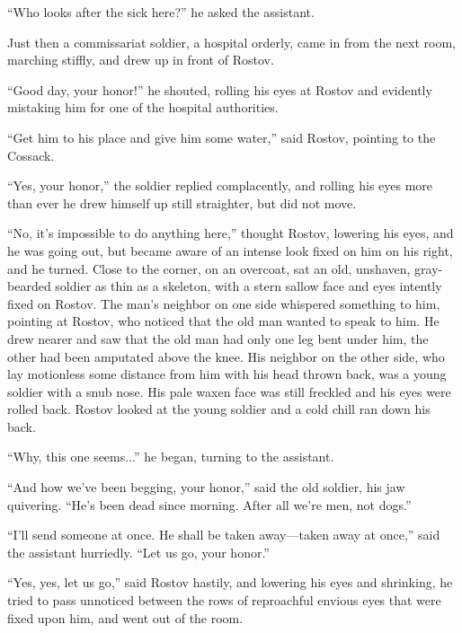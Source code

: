 ``Who looks after the sick here?'' he asked the assistant.

Just then a commissariat soldier, a hospital orderly, came in
from the next room, marching stiffly, and drew up in front of
Rostov.

``Good day, your honor!'' he shouted, rolling his eyes at Rostov
and evidently mistaking him for one of the hospital authorities.

``Get him to his place and give him some water,'' said Rostov,
pointing to the Cossack.

``Yes, your honor,'' the soldier replied complacently, and
rolling his eyes more than ever he drew himself up still
straighter, but did not move.

``No, it's impossible to do anything here,'' thought Rostov,
lowering his eyes, and he was going out, but became aware of an
intense look fixed on him on his right, and he turned. Close to
the corner, on an overcoat, sat an old, unshaven, gray-bearded
soldier as thin as a skeleton, with a stern sallow face and eyes
intently fixed on Rostov. The man's neighbor on one side
whispered something to him, pointing at Rostov, who noticed that
the old man wanted to speak to him. He drew nearer and saw that
the old man had only one leg bent under him, the other had been
amputated above the knee. His neighbor on the other side, who lay
motionless some distance from him with his head thrown back, was
a young soldier with a snub nose. His pale waxen face was still
freckled and his eyes were rolled back. Rostov looked at the
young soldier and a cold chill ran down his back.

``Why, this one seems...'' he began, turning to the assistant.

``And how we've been begging, your honor,'' said the old soldier,
his jaw quivering. ``He's been dead since morning. After all
we're men, not dogs.''

``I'll send someone at once. He shall be taken away---taken away
at once,'' said the assistant hurriedly. ``Let us go, your
honor.''

``Yes, yes, let us go,'' said Rostov hastily, and lowering his
eyes and shrinking, he tried to pass unnoticed between the rows
of reproachful envious eyes that were fixed upon him, and went
out of the room.


